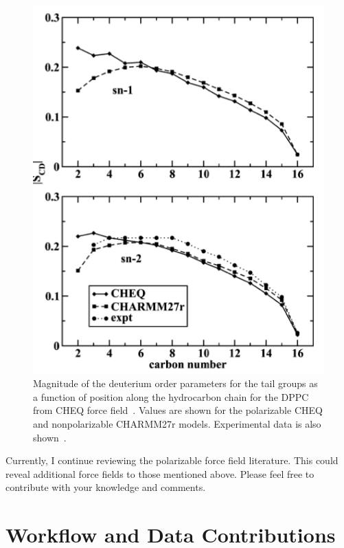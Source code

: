 \documentclass[journal=jpcbfk,manuscript=article,layout=twocolumn]{achemso}
\begin{document}
\begin{figure}[!hbt]
	
	\centering
	\includegraphics[width=\columnwidth]{../Figures/dppc_order_parameters_cheq.png}
	\caption{Magnitude of the deuterium order parameters for the tail groups as a function of position along the hydrocarbon chain for the DPPC from CHEQ force field~\cite{davis2009charge}. Values are shown for the polarizable CHEQ and nonpolarizable CHARMM27r models. Experimental data is also shown~\cite{douliez1995restatement}.}
	\label{fig:dppccheq}
	
\end{figure}

Currently, I continue reviewing the polarizable force field literature. This could reveal additional force fields to those mentioned above. Please feel free to contribute with your knowledge and comments.

\section{Workflow and Data Contributions}
\end{document}
